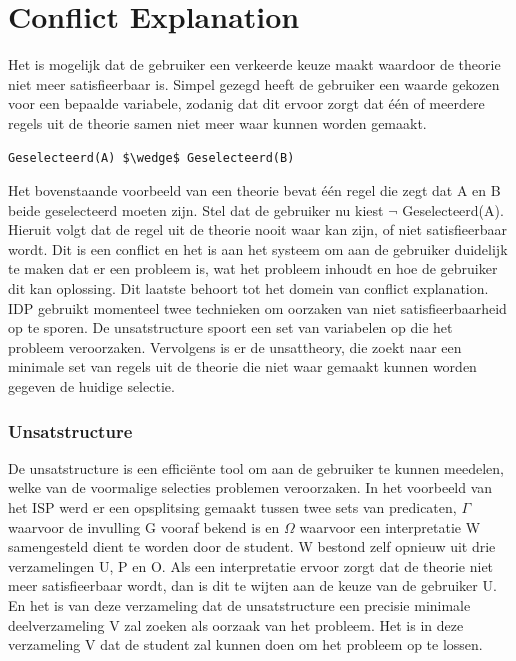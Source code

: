 \section{Conflict Explanation}
Het is mogelijk dat de gebruiker een verkeerde keuze maakt waardoor de theorie niet meer satisfieerbaar is. Simpel gezegd heeft de gebruiker een waarde gekozen voor een bepaalde variabele, zodanig dat dit ervoor zorgt dat \'{e}\'{e}n of meerdere regels uit de theorie samen niet meer waar kunnen worden gemaakt.

\begin{lstlisting}[mathescape]
Geselecteerd(A) $\wedge$ Geselecteerd(B)
\end{lstlisting}

Het bovenstaande voorbeeld van een theorie bevat \'{e}\'{e}n regel die zegt dat A en B beide geselecteerd moeten zijn. Stel dat de gebruiker nu kiest $\neg$ Geselecteerd(A). Hieruit volgt dat de regel uit de theorie nooit waar kan zijn, of niet satisfieerbaar wordt. Dit is een conflict en het is aan het systeem om aan de gebruiker duidelijk te maken dat er een probleem is, wat het probleem inhoudt en hoe de gebruiker dit kan oplossing. Dit laatste behoort tot het domein van conflict explanation. IDP gebruikt momenteel twee technieken om oorzaken van niet satisfieerbaarheid op te sporen. De unsatstructure spoort een set van variabelen op die het probleem veroorzaken. Vervolgens is er de unsattheory, die zoekt naar een minimale set van regels uit de theorie die niet waar gemaakt kunnen worden gegeven de huidige selectie.

\subsubsection{Unsatstructure}
De unsatstructure is een effici\"{e}nte tool om aan de gebruiker te kunnen meedelen, welke van de voormalige selecties problemen veroorzaken. In het voorbeeld van het ISP werd er een opsplitsing gemaakt tussen twee sets van predicaten, $\Gamma$ waarvoor de invulling G vooraf bekend is en $\Omega$ waarvoor een interpretatie W samengesteld dient te worden door de student. W bestond zelf opnieuw uit drie verzamelingen U, P en O. Als een interpretatie ervoor zorgt dat de theorie niet meer satisfieerbaar wordt, dan is dit te wijten aan de keuze van de gebruiker U. En het is van deze verzameling dat de unsatstructure een precisie minimale deelverzameling V zal zoeken als oorzaak van het probleem. Het is in deze verzameling V dat de student zal kunnen doen om het probleem op te lossen. 

